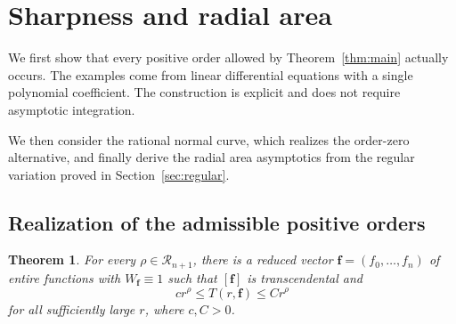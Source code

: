 \documentclass[12pt,letterpaper,reqno]{amsart}
\newtheorem{thm}{Theorem}[section]
\theoremstyle{definition}
\numberwithin{equation}{section}
\newcommand{\Gn}{\mathcal R_{n+1}}
\newcommand{\fv}{\bm f}
\begin{document}
\section{Sharpness and radial area}\label{sec:sharpness}

We first show that every positive order allowed by
Theorem~\ref{thm:main} actually occurs. The examples come from linear
differential equations with a single polynomial coefficient. The
construction is explicit and does not require asymptotic integration.

We then consider the rational normal curve, which realizes the
order-zero alternative, and finally derive the radial area asymptotics
from the regular variation proved in Section~\ref{sec:regular}.


\subsection{Realization of the admissible positive orders}

\begin{thm}\label{thm:realization}
For every \(\rho\in\Gn\), there is a reduced vector
\(\fv=(f_0,\ldots,f_{n})\) of entire functions with
\(W_{\fv}\equiv1\) such that \([\fv]\) is transcendental and
\begin{equation}\label{eq:realization-T-growth}
 c r^\rho
 \leq
 T(r,\fv)
 \leq
 C r^\rho
\end{equation}
for all sufficiently large \(r\), where \(c,C>0\).
\end{thm}
\end{document}
